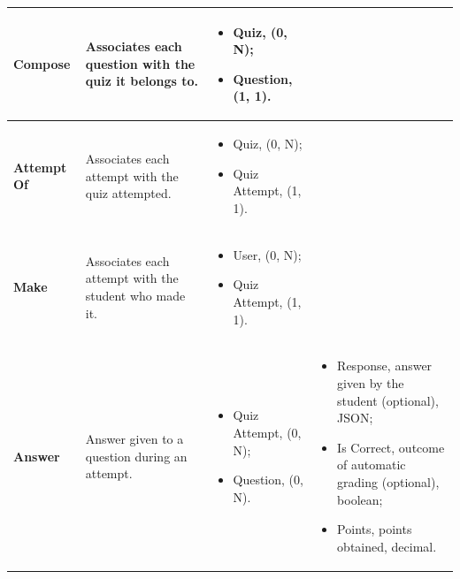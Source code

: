 {\begin{longtable}{|p{}|p{}|p{}|p{}|}
    \\ \hline

    \textbf{Compose} & Associates each question with the quiz it belongs to. &
    \begin{itemize}[leftmargin=*,nosep,before=\vspace{-\baselineskip}\leavevmode,after=\vspace{-\baselineskip}]
        \item Quiz, (0, N);
        \item Question, (1, 1).
    \end{itemize}
    &
    
    \\ \hline

    \textbf{Attempt Of} & Associates each attempt with the quiz attempted. &
    \begin{itemize}[leftmargin=*,nosep,before=\vspace{-\baselineskip}\leavevmode,after=\vspace{-\baselineskip}]
        \item Quiz, (0, N);
        \item Quiz Attempt, (1, 1).
    \end{itemize}
    &
    
    \\ \hline

    \textbf{Make} & Associates each attempt with the student who made it. &
    \begin{itemize}[leftmargin=*,nosep,before=\vspace{-\baselineskip}\leavevmode,after=\vspace{-\baselineskip}]
        \item User, (0, N);
        \item Quiz Attempt, (1, 1).
    \end{itemize}
    &
    
    \\ \hline

    \textbf{Answer} & Answer given to a question during an attempt. &
    \begin{itemize}[leftmargin=*,nosep,before=\vspace{-\baselineskip}\leavevmode,after=\vspace{-\baselineskip}]
        \item Quiz Attempt, (0, N);
        \item Question, (0, N).
    \end{itemize}
    &
    \begin{itemize}[leftmargin=*,nosep,before=\vspace{-\baselineskip}\leavevmode,after=\vspace{-\baselineskip}]
        \item Response, answer given by the student (optional), JSON;
        \item Is Correct, outcome of automatic grading (optional), boolean;
        \item Points, points obtained, decimal.
    \end{itemize}
    \\ \hline


\end{longtable}}
